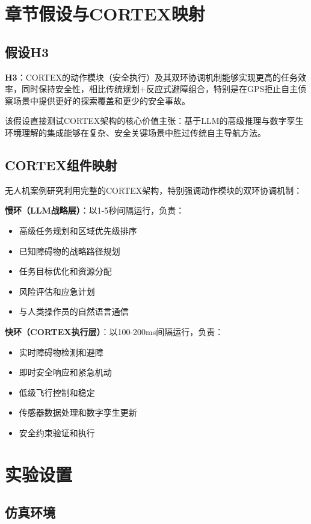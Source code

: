 \section{章节假设与CORTEX映射}

\subsection{假设H3}

\textbf{H3}：CORTEX的动作模块（安全执行）及其双环协调机制能够实现更高的任务效率，同时保持安全性，相比传统规划+反应式避障组合，特别是在GPS拒止自主侦察场景中提供更好的探索覆盖和更少的安全事故。

该假设直接测试CORTEX架构的核心价值主张：基于LLM的高级推理与数字孪生环境理解的集成能够在复杂、安全关键场景中胜过传统自主导航方法。

\subsection{CORTEX组件映射}

无人机案例研究利用完整的CORTEX架构，特别强调动作模块的双环协调机制：

\textbf{慢环（LLM战略层）}：以1-5秒间隔运行，负责：
\begin{itemize}
\item 高级任务规划和区域优先级排序
\item 已知障碍物的战略路径规划
\item 任务目标优化和资源分配
\item 风险评估和应急计划
\item 与人类操作员的自然语言通信
\end{itemize}

\textbf{快环（CORTEX执行层）}：以100-200ms间隔运行，负责：
\begin{itemize}
\item 实时障碍物检测和避障
\item 即时安全响应和紧急机动
\item 低级飞行控制和稳定
\item 传感器数据处理和数字孪生更新
\item 安全约束验证和执行
\end{itemize}

\section{实验设置}

\subsection{仿真环境}

